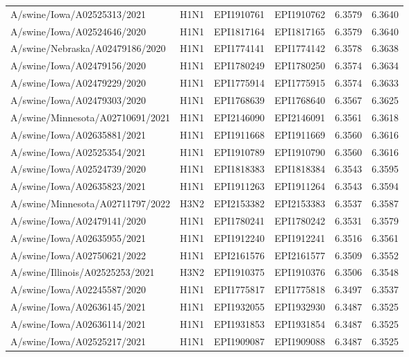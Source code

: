 \begin{tabular}{L{1.95in}|L{.25in}|L{.60in}|L{.6in}|C{1in}|C{1in}}
 A/swine/Iowa/A02525313/2021 &H1N1&EPI1910761&EPI1910762&6.3579&6.3640\\
 A/swine/Iowa/A02524646/2020 &H1N1&EPI1817164&EPI1817165&6.3579&6.3640\\
 A/swine/Nebraska/A02479186/2020 &H1N1&EPI1774141&EPI1774142&6.3578&6.3638\\
 A/swine/Iowa/A02479156/2020 &H1N1&EPI1780249&EPI1780250&6.3574&6.3634\\
 A/swine/Iowa/A02479229/2020 &H1N1&EPI1775914&EPI1775915&6.3574&6.3633\\
 A/swine/Iowa/A02479303/2020 &H1N1&EPI1768639&EPI1768640&6.3567&6.3625\\
 A/swine/Minnesota/A02710691/2021 &H1N1&EPI2146090&EPI2146091&6.3561&6.3618\\
 A/swine/Iowa/A02635881/2021 &H1N1&EPI1911668&EPI1911669&6.3560&6.3616\\
 A/swine/Iowa/A02525354/2021 &H1N1&EPI1910789&EPI1910790&6.3560&6.3616\\
 A/swine/Iowa/A02524739/2020 &H1N1&EPI1818383&EPI1818384&6.3543&6.3595\\
 A/swine/Iowa/A02635823/2021 &H1N1&EPI1911263&EPI1911264&6.3543&6.3594\\
 A/swine/Minnesota/A02711797/2022 &H3N2&EPI2153382&EPI2153383&6.3537&6.3587\\
 A/swine/Iowa/A02479141/2020 &H1N1&EPI1780241&EPI1780242&6.3531&6.3579\\
 A/swine/Iowa/A02635955/2021 &H1N1&EPI1912240&EPI1912241&6.3516&6.3561\\
 A/swine/Iowa/A02750621/2022 &H1N1&EPI2161576&EPI2161577&6.3509&6.3552\\
 A/swine/Illinois/A02525253/2021 &H3N2&EPI1910375&EPI1910376&6.3506&6.3548\\
 A/swine/Iowa/A02245587/2020 &H1N1&EPI1775817&EPI1775818&6.3497&6.3537\\
 A/swine/Iowa/A02636145/2021 &H1N1&EPI1932055&EPI1932930&6.3487&6.3525\\
 A/swine/Iowa/A02636114/2021 &H1N1&EPI1931853&EPI1931854&6.3487&6.3525\\
 A/swine/Iowa/A02525217/2021 &H1N1&EPI1909087&EPI1909088&6.3487&6.3525\\

\end{tabular}
